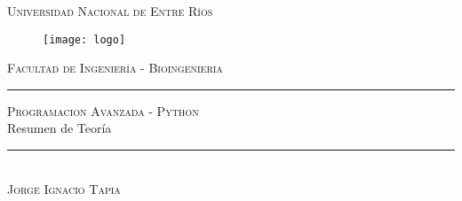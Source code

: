 \begin{titlepage}
	\begin{center}
		\centering \Huge \textsc{Universidad Nacional de Entre Ríos} \\
	\end{center}
\vspace{1cm}
	
	\begin{figure}[h]
		\centering
		\texttt{[image: logo]}	
	\end{figure}
\vspace{1.5cm}
	\centering \LARGE \textsc{Facultad de Ingeniería - Bioingenieria}
\vspace{1cm}
	
	\textcolor{blue-violet}{\rule{\linewidth}{0.75mm}}
	\vspace{1mm}
	\begin{spacing}{1.5}
		\centering \LARGE \textsc{Programacion Avanzada - Python} \\
		\centering \LARGE {Resumen de Teoría}
	\end{spacing}
	\vspace{5mm}
	\textcolor{blue-violet}{\rule{\linewidth}{0.75mm}}\\
	\vspace{1cm}
	\vfill
	\centering \LARGE  \textsc{Jorge Ignacio Tapia}
	\vfill
\end{titlepage}